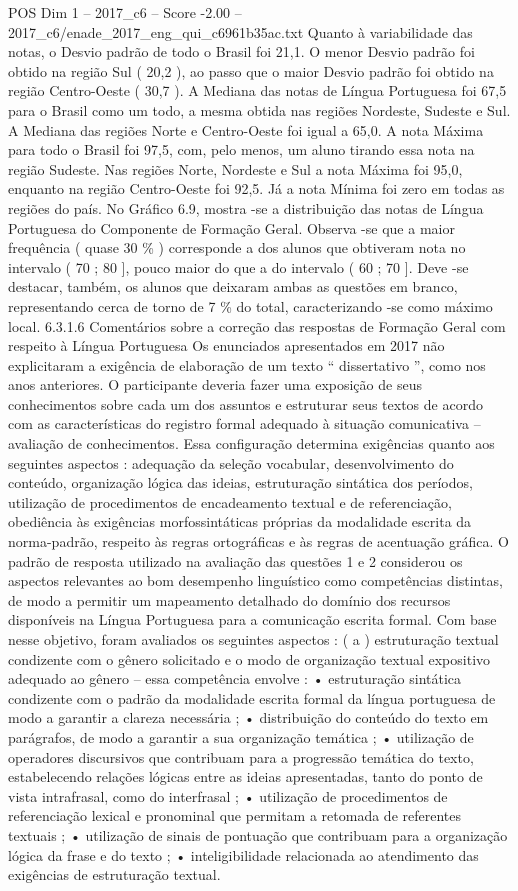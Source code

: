 \begin{textsample}{POS Dim 1 – 2017\_c6 – Score -2.00 – 2017\_c6/enade\_2017\_eng\_qui\_c6961b35ac.txt}
Quanto à variabilidade das notas, o Desvio padrão de todo o Brasil foi 21,1.
O menor Desvio padrão foi obtido na região Sul ( 20,2 ), ao passo que o maior Desvio padrão foi obtido na região Centro-Oeste ( 30,7 ).
A Mediana das notas de Língua Portuguesa foi 67,5 para o Brasil como um todo, a mesma obtida nas regiões Nordeste, Sudeste e Sul.
A Mediana das regiões Norte e Centro-Oeste foi igual a 65,0.
A nota Máxima para todo o Brasil foi 97,5, com, pelo menos, um aluno tirando essa nota na região Sudeste.
Nas regiões Norte, Nordeste e Sul a nota Máxima foi 95,0, enquanto na região Centro-Oeste foi 92,5.
Já a nota Mínima foi zero em todas as regiões do país.
No Gráfico 6.9, mostra -se a distribuição das notas de Língua Portuguesa do Componente de Formação Geral.
Observa -se que a maior frequência ( quase 30 \% ) corresponde a dos alunos que obtiveram nota no intervalo ( 70 ; 80 ], pouco maior do que a do intervalo ( 60 ; 70 ].
Deve -se destacar, também, os alunos que deixaram ambas as questões em branco, representando cerca de torno de 7 \% do total, caracterizando -se como máximo local. 6.3.1.6 Comentários sobre a correção das respostas de Formação Geral com respeito à Língua Portuguesa Os enunciados apresentados em 2017 não explicitaram a exigência de elaboração de um texto “ dissertativo ”, como nos anos anteriores.
O participante deveria fazer uma exposição de seus conhecimentos sobre cada um dos assuntos e estruturar seus textos de acordo com as características do registro formal adequado à situação comunicativa – avaliação de conhecimentos.
Essa configuração determina exigências quanto aos seguintes aspectos : adequação da seleção vocabular, desenvolvimento do conteúdo, organização lógica das ideias, estruturação sintática dos períodos, utilização de procedimentos de encadeamento textual e de referenciação, obediência às exigências morfossintáticas próprias da modalidade escrita da norma-padrão, respeito às regras ortográficas e às regras de acentuação gráfica.
O padrão de resposta utilizado na avaliação das questões 1 e 2 considerou os aspectos relevantes ao bom desempenho linguístico como competências distintas, de modo a permitir um mapeamento detalhado do domínio dos recursos disponíveis na Língua Portuguesa para a comunicação escrita formal.
Com base nesse objetivo, foram avaliados os seguintes aspectos : ( a ) estruturação textual condizente com o gênero solicitado e o modo de organização textual expositivo adequado ao gênero – essa competência envolve : • estruturação sintática condizente com o padrão da modalidade escrita formal da língua portuguesa de modo a garantir a clareza necessária ; • distribuição do conteúdo do texto em parágrafos, de modo a garantir a sua organização temática ; • utilização de operadores discursivos que contribuam para a progressão temática do texto, estabelecendo relações lógicas entre as ideias apresentadas, tanto do ponto de vista intrafrasal, como do interfrasal ; • utilização de procedimentos de referenciação lexical e pronominal que permitam a retomada de referentes textuais ; • utilização de sinais de pontuação que contribuam para a organização lógica da frase e do texto ; • inteligibilidade relacionada ao atendimento das exigências de estruturação textual.

\end{textsample}
